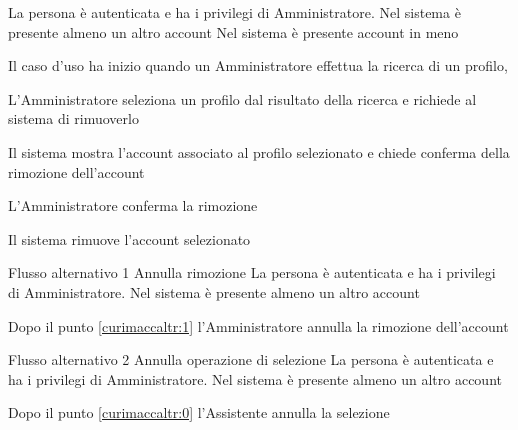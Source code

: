 \tabcuvspace

{}
{La persona è autenticata e ha i privilegi di Amministratore. Nel sistema è presente almeno un altro account}
{Nel sistema è presente account in meno}
{\begin{enumCU}
	\item Il caso d'uso ha inizio quando un Amministratore effettua la ricerca di un profilo, \label{curimaccaltr:0}
	\item L'Amministratore seleziona un profilo dal risultato della ricerca e richiede al sistema di rimuoverlo 
	\item Il sistema mostra l'account associato al profilo selezionato e chiede conferma della rimozione dell'account\label{curimaccaltr:1}
	\item L'Amministratore conferma la rimozione
	\item Il sistema rimuove l'account selezionato
\end{enumCU}}
%
{Flusso alternativo 1}%
{Annulla rimozione}%
{La persona è autenticata e ha i privilegi di Amministratore. Nel sistema è presente almeno un altro account}%
{\postNulle}%
{\begin{enumCU}
	\item Dopo il punto \ref{curimaccaltr:1} l'Amministratore annulla la rimozione dell'account
\end{enumCU}}%
%	
{Flusso alternativo 2}%
{Annulla operazione di selezione}%
{La persona è autenticata e ha i privilegi di Amministratore. Nel sistema è presente almeno un altro account}%
{\postNulle}%
{\begin{enumCU}
	\item Dopo il punto \ref{curimaccaltr:0} l'Assistente annulla la selezione
\end{enumCU}}%

\tabcuvspace

